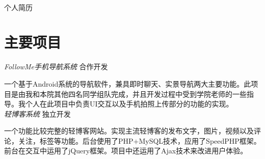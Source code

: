 \documentclass[10pt]{article} %
\begin{document}
\color{text1} %


\par{\\ %
{\color{headings} 个人简历 \\[15pt]\par} %
	

\begin{minipage}[t]{0.5\textwidth} %
\vspace{0pt} %
	

\section{主要项目} 


{\large \textit{FollowMe手机导航系统}} \hfill  \hfill {\textsc{合作开发}\\}

\normalsize{一个基于Android系统的导航软件，兼具即时聊天、实景导航两大主要功能。此项目是由我和本院其他四名同学组队完成，并且开发过程中受到学院老师的一些指导。我个人在此项目中负责UI交互以及手机拍照上传部分的功能的实现。}\\


{\large \textit{轻博客系统}} \hfill  \hfill {\textsc{独立开发}\\}

\normalsize{一个功能比较完整的轻博客网站。实现主流轻博客的发布文字，图片，视频以及评论，关注，标签等功能。后台使用了PHP+MySQL技术，应用了SpeedPHP框架。前台在交互中运用了jQuery框架。项目中还运用了Ajax技术来改进用户体验。}\\


\end{minipage}}
\end{document}
